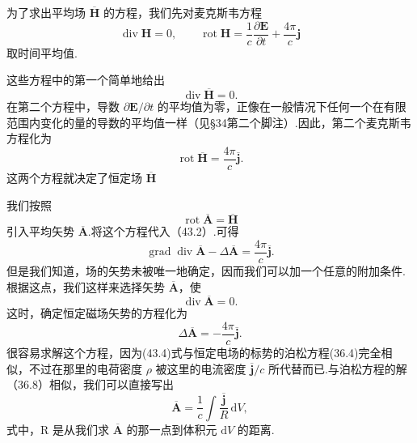 为了求出平均场 $\overline{\boldsymbol{H}}$ 的方程，我们先对麦克斯韦方程
\begin{equation*}
  \operatorname{div}\boldsymbol{H}=0,\qquad
  \operatorname{rot}\boldsymbol{H}
  =\frac{1}{c}\frac{\partial\boldsymbol{E}}{\partial t}
  +\frac{4\pi}{c}\boldsymbol{j}
\end{equation*}
取时间平均值.

这些方程中的第一个简单地给出
\begin{equation}
  \operatorname{div}\overline{\boldsymbol{H}}=0.
\end{equation}
在第二个方程中，导数 $\partial\boldsymbol{E}/\partial t$ 的平均值为零，正像在一般情况下任何一个在有限范围内变化的量的导数的平均值一样（见§34第二个脚注）.因此，第二个麦克斯韦方程化为
\begin{equation}
  \operatorname{rot}\overline{\boldsymbol{H}}=\frac{4\pi}{c}\overline{\boldsymbol{j}}.
\end{equation}
这两个方程就决定了恒定场 $\overline{\boldsymbol{H}}$

我们按照
\begin{equation*}
  \operatorname{rot}\overline{\boldsymbol{A}}=\overline{\boldsymbol{H}}
\end{equation*}
引入平均矢势 $\overline{\boldsymbol{A}}$.将这个方程代入（43.2）.可得
\begin{equation*}
  \operatorname{grad}\operatorname{div}\overline{\boldsymbol{A}}
  -\Delta\overline{\boldsymbol{A}}
  =\frac{4\pi}{c}\overline{\boldsymbol{j}}.
\end{equation*}
但是我们知道，场的矢势未被唯一地确定，因而我们可以加一个任意的附加条件.根据这点，我们这样来选择矢势 $\overline{\boldsymbol{A}}$，使
\begin{equation}
  \operatorname{div}\overline{\boldsymbol{A}}=0.
\end{equation}
这时，确定恒定磁场矢势的方程化为
\begin{equation}
  \Delta\overline{\boldsymbol{A}}=-\frac{4\pi}{c}\overline{\boldsymbol{j}}.
\end{equation}
很容易求解这个方程，因为(43.4)式与恒定电场的标势的泊松方程(36.4)完全相似，不过在那里的电荷密度 $\rho$ 被这里的电流密度 $\overline{\boldsymbol{j}}/c$ 所代替而已.与泊松方程的解（36.8）相似，我们可以直接写出
\begin{equation}
  \overline{\boldsymbol{A}}=\frac{1}{c}\int\frac{\overline{\boldsymbol{j}}}{R}\,\mathrm{d}V,
\end{equation}
式中，R 是从我们求 $\overline{\boldsymbol{A}}$ 的那一点到体积元 $\mathrm{d}V$ 的距离.

